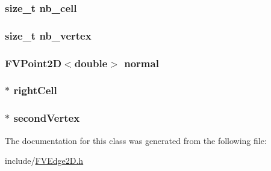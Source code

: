\label{db/d31/classFVEdge2D_a928b11f5716331f0b89abe7d8d4124b4}
\hypertarget{classFVEdge2D_a1a5a11cfc8bbaa0cf132759c0382da70}{
\subsubsection[{nb\_\-cell}]{\setlength{\rightskip}{0pt plus 5cm}size\_\-t {\bf nb\_\-cell}}}
\label{db/d31/classFVEdge2D_a1a5a11cfc8bbaa0cf132759c0382da70}
\hypertarget{classFVEdge2D_a0a063e99fbc85e837d93dfbcda6f5252}{
\subsubsection[{nb\_\-vertex}]{\setlength{\rightskip}{0pt plus 5cm}size\_\-t {\bf nb\_\-vertex}}}
\label{db/d31/classFVEdge2D_a0a063e99fbc85e837d93dfbcda6f5252}
\hypertarget{classFVEdge2D_a5b771cf762f8097181201565a3e7b490}{
\subsubsection[{normal}]{\setlength{\rightskip}{0pt plus 5cm}FVPoint2D$<$double$>$ {\bf normal}}}
\label{db/d31/classFVEdge2D_a5b771cf762f8097181201565a3e7b490}
\hypertarget{classFVEdge2D_a0b77cc6541648a710e72fc0a59cb318d}{
\subsubsection[{rightCell}]{ $\ast$ {\bf rightCell}}}
\label{db/d31/classFVEdge2D_a0b77cc6541648a710e72fc0a59cb318d}
\hypertarget{classFVEdge2D_ac6bb5fc1a5f4ae86b6d0b5d06d86dc05}{
\subsubsection[{secondVertex}]{ $\ast$ {\bf secondVertex}}}
\label{db/d31/classFVEdge2D_ac6bb5fc1a5f4ae86b6d0b5d06d86dc05}


The documentation for this class was generated from the following file:\begin{DoxyCompactItemize}
\item 
include/\hyperlink{FVEdge2D_8h}{FVEdge2D.h}\end{DoxyCompactItemize}
